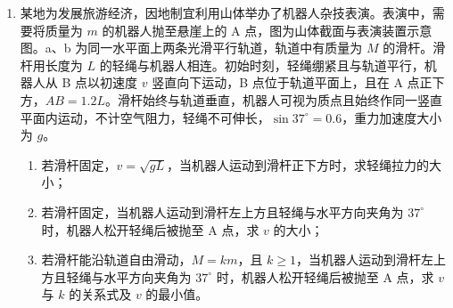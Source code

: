 \documentclass[\gkver]{gaokaozhenti}
\begin{document}
\begin{enumerate}
{竖直方向做匀变速直线运动 $\frac{d}{2}=\frac{0+v_{y}}{2}t$，$v_{y}=at=\frac{qU}{md}t$

由闭合回路欧姆定律可得 $U=\frac{r_{0}}{r_{0}+2r_{0}}E_{0}$

联立可得 $v_{y}=\frac{\sqrt{3}}{3}v_{0}$，$q=\frac{mv_{0}^{2}}{E_{0}}$

（2）粒子进入磁场时与竖直方向的夹角为 $\theta$，则 $\tan\theta=\frac{v_{x}}{v_{y}}=\sqrt{3}$，即 $\theta=60^{\circ}$，$v=\frac{v_{0}}{\sin60^{\circ}}=\frac{2\sqrt{3}}{3}v_{0}$

粒子在磁场中做匀速圆周运动 $qvB=m\frac{v^{2}}{R}$

由几何关系易得 $R=\frac{\frac{d}{2}}{\cos30^{\circ}}=\frac{\sqrt{3}d}{3}$

联立可得 $B=\frac{2E_{0}}{dv_{0}}$

（3）取一个竖直向上的速度使得其对应的洛伦兹力和水平向右的电场力平衡，则有 $qv_{y1}B=qE$

解得 $v_{y1}=\frac{2\sqrt{3}}{3}v_{0}$

粒子以 $v_{y1}$ 速度向上做匀速直线运动，粒子做圆周运动的合速度的竖直方向分速度为 $v_{y2}=v_{y1}+v_{y}=\sqrt{3}v_{0}$

此时合速度与竖直方向的夹角为
$\tan\alpha=\frac{v_{0}}{\sqrt{3}v_{0}}$

合速度为 $v'=\sqrt{(\sqrt{3}v_{0})^{2}+v_{0}^{2}}$，则 $v'=2v_{0}$

粒子做圆周运动的半径 $r=\frac{mv'}{Bq}$，解得 $r=d$

最远距离为 $x_{m}=r+r\cos\alpha=\frac{2+\sqrt{3}}{2}d$。
}

\item
某地为发展旅游经济，因地制宜利用山体举办了机器人杂技表演。表演中，需要将质量为 $m$ 的机器人抛至悬崖上的 A 点，图为山体截面与表演装置示意图。a、b 为同一水平面上两条光滑平行轨道，轨道中有质量为 $M$ 的滑杆。滑杆用长度为 $L$ 的轻绳与机器人相连。初始时刻，轻绳绷紧且与轨道平行，机器人从 B 点以初速度 $v$ 竖直向下运动，B 点位于轨道平面上，且在 A 点正下方，$AB=1.2L$。滑杆始终与轨道垂直，机器人可视为质点且始终作同一竖直平面内运动，不计空气阻力，轻绳不可伸长，$\sin37^{\circ}=0.6$，重力加速度大小为 $g$。
\begin{enumerate}
	\item
	若滑杆固定，$v=\sqrt{gL}$，当机器人运动到滑杆正下方时，求轻绳拉力的大小；
	\item
	若滑杆固定，当机器人运动到滑杆左上方且轻绳与水平方向夹角为 $37^{\circ}$ 时，机器人松开轻绳后被抛至 A 点，求 $v$ 的大小；
	\item
	若滑杆能沿轨道自由滑动，$M=km$，且 $k\geq1$，当机器人运动到滑杆左上方且轻绳与水平方向夹角为 $37^{\circ}$ 时，机器人松开轻绳后被抛至 A 点，求 $v$ 与 $k$ 的关系式及 $v$ 的最小值。
\end{enumerate}


\end{enumerate}
\end{document}
